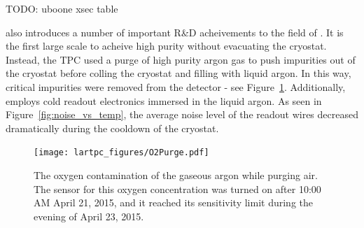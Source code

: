 TODO: uboone xsec table

\uboone also introduces a number of important R\&D acheivements to the field of \lartpcs.  It is the first large scale \lartpc to acheive high purity without evacuating the cryostat.  Instead, the TPC used a purge of high purity argon gas to push impurities out of the cryostat before colling the cryostat and filling with liquid argon.   In this way, critical impurities were removed from the detector - see Figure~\ref{fig:o2purge}.  Additionally, \uboone employs cold readout electronics immersed in the liquid argon.  As seen in Figure~\ref{fig:noise_vs_temp}, the average noise level of the readout wires decreased dramatically during the cooldown of the \uboone cryostat.

\begin{figure}[htb]
  \centering
  \texttt{[image: lartpc\_figures/O2Purge.pdf]}
  \caption[\uboone O2 Contamination]{The oxygen contamination of the gaseous argon while purging air. The sensor for this oxygen concentration was turned on after 10:00 AM April 21, 2015, and it reached its sensitivity limit during the evening of April 23, 2015. \cite{uboone_pub_1003}}
  \label{fig:o2purge}
\end{figure}


